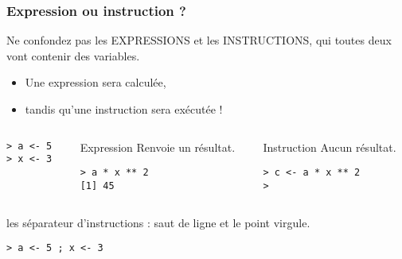 \documentclass[10pt]{beamer}
\begin{document}

\begin{frame}[fragile]
  \frametitle{Expression ou instruction ?}
  Ne confondez pas les EXPRESSIONS et les INSTRUCTIONS, qui toutes deux vont contenir des variables.
  \begin{itemize}
  \item Une expression sera \alert{calculée},
  \item tandis qu'une instruction sera \alert{exécutée} !
  \end{itemize}


  
\begin{columns}[b]
\begin{column}{0.33\textwidth}
    \begin{lstlisting}
> a <- 5
> x <- 3
\end{lstlisting}
    
\end{column}
    
\begin{column}{0.33\textwidth}
  \begin{alertblock}{Expression}
    Renvoie un résultat.
    \begin{lstlisting}
> a * x ** 2
[1] 45      
    \end{lstlisting}
    
  \end{alertblock}
\end{column}
\begin{column}{0.33\textwidth}
  \begin{alertblock}{Instruction}
    Aucun résultat.
    \begin{lstlisting}
> c <- a * x ** 2
>
    \end{lstlisting}
  \end{alertblock}
\end{column}
\end{columns}

\begin{block}{les séparateur d'instructions : saut de ligne et le point virgule.}
  \begin{lstlisting}[style=block]
> a <- 5 ; x <- 3
\end{lstlisting}
  
\end{block}
\end{frame}
\end{document}
